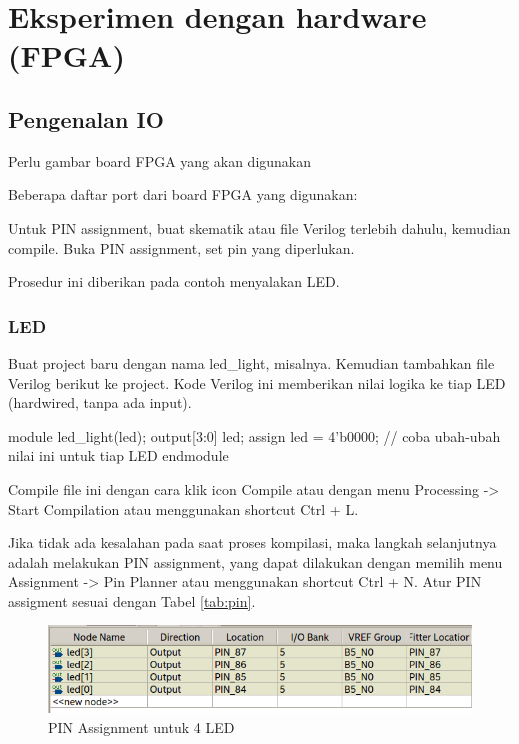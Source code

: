 \section{Eksperimen dengan hardware (FPGA)}

\subsection{Pengenalan IO}

{\color{red} Perlu gambar board FPGA yang akan digunakan}

Beberapa daftar port dari board FPGA yang digunakan:



Untuk PIN assignment, buat skematik atau file Verilog terlebih dahulu, kemudian compile.
Buka PIN assignment, set pin yang diperlukan.

Prosedur ini diberikan pada contoh menyalakan LED.

\subsubsection{LED}

Buat project baru dengan nama {\sf led\_light},
misalnya. Kemudian tambahkan file Verilog berikut
ke project. Kode Verilog ini memberikan nilai logika ke tiap
LED (hardwired, tanpa ada input).

{
\begin{verilogcode}
module led_light(led);
  output[3:0] led;
  assign led = 4'b0000; // coba ubah-ubah nilai ini untuk tiap LED
endmodule
\end{verilogcode}
}

Compile file ini dengan cara klik icon {\sf Compile} atau dengan menu
{\sf Processing -> Start Compilation} atau menggunakan shortcut
{\sf Ctrl + L}.

Jika tidak ada kesalahan pada saat proses kompilasi,
maka langkah selanjutnya adalah melakukan
PIN assignment, yang dapat dilakukan dengan memilih menu
{\sf Assignment -> Pin Planner} atau menggunakan shortcut
{\sf Ctrl + N}. Atur PIN assigment sesuai dengan Tabel \ref{tab:pin}.

\begin{figure}[H]
\centering
\includegraphics[scale=0.5]{images/PinPlanner_4LED.png}
\par
\caption{PIN Assignment untuk 4 LED}
\end{figure}

